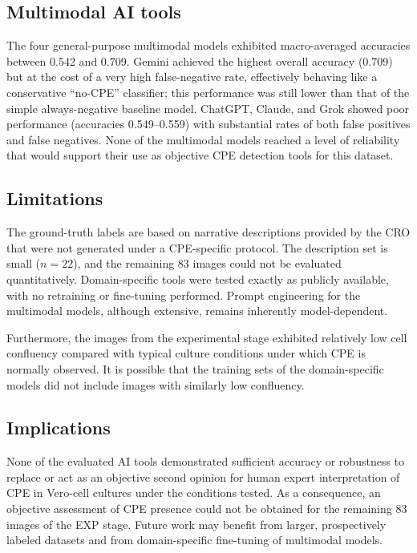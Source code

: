 \documentclass[12pt,a4paper]{article}
\begin{document}
\subsection{Multimodal AI tools}
The four general-purpose multimodal models exhibited macro-averaged accuracies between 0.542 and 0.709. Gemini achieved the highest overall accuracy (0.709) but at the cost of a very high false-negative rate, effectively behaving like a conservative ``no-CPE'' classifier; this performance was still lower than that of the simple always-negative baseline model. ChatGPT, Claude, and Grok showed poor performance (accuracies 0.549--0.559) with substantial rates of both false positives and false negatives. None of the multimodal models reached a level of reliability that would support their use as objective CPE detection tools for this dataset.

\subsection{Limitations}
The ground-truth labels are based on narrative descriptions provided by the CRO that were not generated under a CPE-specific protocol. The description set is small (\(n = 22\)), and the remaining 83 images could not be evaluated quantitatively. Domain-specific tools were tested exactly as publicly available, with no retraining or fine-tuning performed. Prompt engineering for the multimodal models, although extensive, remains inherently model-dependent.

Furthermore, the images from the experimental stage exhibited relatively low cell confluency compared with typical culture conditions under which CPE is normally observed. It is possible that the training sets of the domain-specific models did not include images with similarly low confluency.

\subsection{Implications}
None of the evaluated AI tools demonstrated sufficient accuracy or robustness to replace or act as an objective second opinion for human expert interpretation of CPE in Vero-cell cultures under the conditions tested. As a consequence, an objective assessment of CPE presence could not be obtained for the remaining 83 images of the EXP stage. Future work may benefit from larger, prospectively labeled datasets and from domain-specific fine-tuning of multimodal models.
\end{document}
